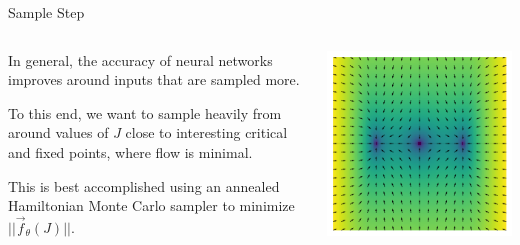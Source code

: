 \documentclass[aspectratio=169, 12pt]{beamer}
\begin{document}
\begin{frame}{Sample Step}

    \begin{columns}
        \begin{column}{.6\textwidth}
            
            In general, the accuracy of neural networks improves around inputs that are sampled more. 

            \vspace{1em}

            To this end, we want to sample heavily from around values of $J$ close to interesting critical and fixed points, where flow is minimal. 

            \vspace{1em}

            This is best accomplished using an annealed Hamiltonian Monte Carlo sampler to minimize $|| \vec{f}_\theta(J) ||$. 
            
        \end{column}
        \begin{column}{.4\textwidth}
            \includegraphics[width=\textwidth]{presentation/images/flow-heat.png}
        \end{column}
    \end{columns}
    
\end{frame}
\end{document}
